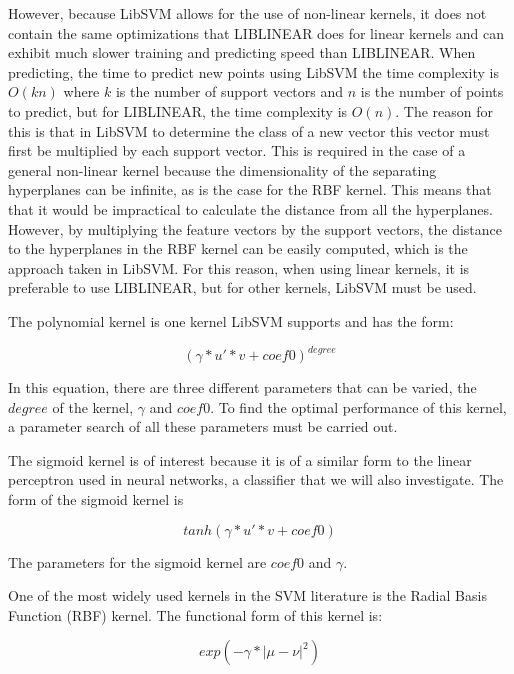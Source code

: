 However, because LibSVM allows for the use of non-linear kernels, it
does not contain the same optimizations that LIBLINEAR does for linear
kernels and can exhibit much slower training and predicting speed than
LIBLINEAR.  When predicting, the time to predict new points using
LibSVM the time complexity is $O(kn)$ where $k$ is the number of
support vectors and $n$ is the number of points to predict, but for
LIBLINEAR, the time complexity is $O(n)$.  The reason for this is that
in LibSVM to determine the class of a new vector this vector must
first be multiplied by each support vector.  This is required in the
case of a general non-linear kernel because the dimensionality of the
separating hyperplanes can be infinite, as is the case for the RBF
kernel.  This means that that it would be impractical to calculate the
distance from all the hyperplanes.  However, by multiplying the
feature vectors by the support vectors, the distance to the
hyperplanes in the RBF kernel can be easily computed, which is the
approach taken in LibSVM.  For this reason, when using linear kernels,
it is preferable to use LIBLINEAR, but for other kernels, LibSVM must
be used.

The polynomial kernel is one kernel LibSVM supports and has the form:

\begin{equation} 
 (\gamma*u'*v + {coef0})^{degree}  
\end{equation}

In this equation, there are three different parameters that can be
varied, the $degree$ of the kernel, $\gamma$ and ${coef0}$.  To find the
optimal performance of this kernel, a parameter search of all these
parameters must be carried out.  

The sigmoid kernel is of interest because it is of a similar form to
the linear perceptron used in neural networks, a classifier that we
will also investigate.  The form of the sigmoid kernel is

\begin{equation} 
tanh(\gamma*u'*v + {coef0}) 
\end{equation}

The parameters for the sigmoid kernel are $coef0$ and $\gamma$. 

One of the most widely used kernels in the SVM literature
\cite{scholkopf97rbf} is the Radial Basis Function (RBF) kernel.  The
functional form of this kernel is:

\begin{equation} 
exp(-\gamma*|\mu-\nu|^2) 
\end{equation}

